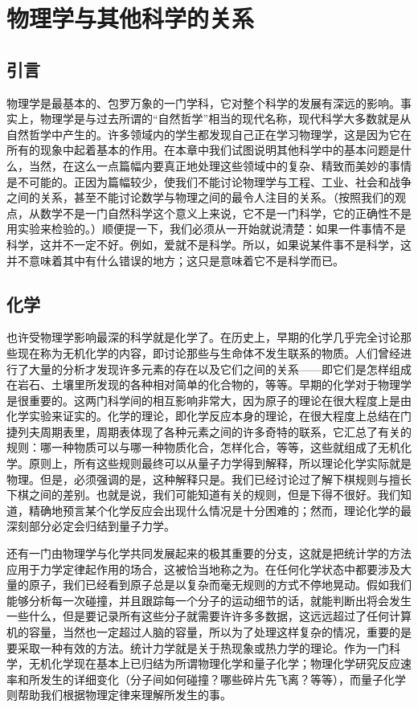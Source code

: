 \chapter{物理学与其他科学的关系}

\section{引言}

物理学是最基本的、包罗万象的一门学科，它对整个科学的发展有深远的影响。事实上，物理学是与过去所谓的“自然哲学”相当的现代名称，现代科学大多数就是从自然哲学中产生的。许多领域内的学生都发现自己正在学习物理学，这是因为它在所有的现象中起着基本的作用。在本章中我们试图说明其他科学中的基本问题是什么，当然，在这么一点篇幅内要真正地处理这些领域中的复杂、精致而美妙的事情是不可能的。正因为篇幅较少，使我们不能讨论物理学与工程、工业、社会和战争之间的关系，甚至不能讨论数学与物理之间的最令人注目的关系。（按照我们的观点，从数学不是一门自然科学这个意义上来说，它不是一门科学，它的正确性不是用实验来检验的。）顺便提一下，我们必须从一开始就说清楚：如果一件事情不是科学，这并不一定不好。例如，爱就不是科学。所以，如果说某件事不是科学，这并不意味着其中有什么错误的地方；这只是意味着它不是科学而已。

\section{化学}

也许受物理学影响最深的科学就是化学了。在历史上，早期的化学几乎完全讨论那些现在称为无机化学的内容，即讨论那些与生命体不发生联系的物质。人们曾经进行了大量的分析才发现许多元素的存在以及它们之间的关系——即它们是怎样组成在岩石、土壤里所发现的各种相对简单的化合物的，等等。早期的化学对于物理学是很重要的。这两门科学间的相互影响非常大，因为原子的理论在很大程度上是由化学实验来证实的。化学的理论，即化学反应本身的理论，在很大程度上总结在门捷列夫周期表里，周期表体现了各种元素之间的许多奇特的联系，它汇总了有关的规则：哪一种物质可以与哪一种物质化合，怎样化合，等等，这些就组成了无机化学。原则上，所有这些规则最终可以从量子力学得到解释，所以理论化学实际就是物理。但是，必须强调的是，这种解释只是。我们已经讨论过了解下棋规则与擅长下棋之间的差别。也就是说，我们可能知道有关的规则，但是下得不很好。我们知道，精确地预言某个化学反应会出现什么情况是十分困难的；然而，理论化学的最深刻部分必定会归结到量子力学。

还有一门由物理学与化学共同发展起来的极其重要的分支，这就是把统计学的方法应用于力学定律起作用的场合，这被恰当地称之为。在任何化学状态中都要涉及大量的原子，我们已经看到原子总是以复杂而毫无规则的方式不停地晃动。假如我们能够分析每一次碰撞，并且跟踪每一个分子的运动细节的话，就能判断出将会发生一些什么，但是要记录所有这些分子就需要许许多多数据，这远远超过了任何计算机的容量，当然也一定超过人脑的容量，所以为了处理这样复杂的情况，重要的是要采取一种有效的方法。统计力学就是关于热现象或热力学的理论。作为一门科学，无机化学现在基本上已归结为所谓物理化学和量子化学；物理化学研究反应速率和所发生的详细变化（分子间如何碰撞？哪些碎片先飞离？等等），而量子化学则帮助我们根据物理定律来理解所发生的事。

